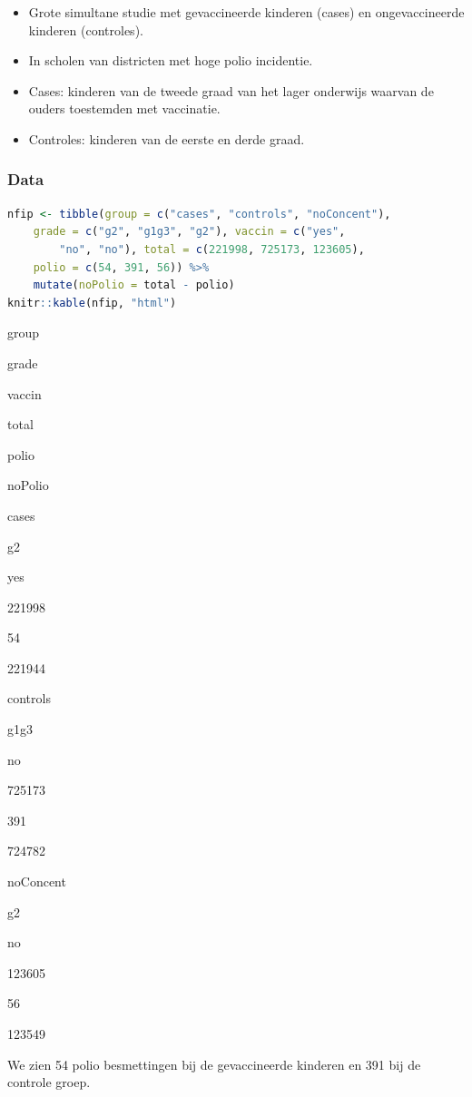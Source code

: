 \documentclass[
  12pt,dutch,coursenotes]{book}
\providecommand{\tightlist}{%
  \setlength{\itemsep}{0pt}\setlength{\parskip}{0pt}}
\begin{document}
\begin{itemize}
\tightlist
\item
  Grote simultane studie met gevaccineerde kinderen (cases) en ongevaccineerde kinderen (controles).
\item
  In scholen van districten met hoge polio incidentie.
\item
  Cases: kinderen van de tweede graad van het lager onderwijs waarvan de ouders toestemden met vaccinatie.
\item
  Controles: kinderen van de eerste en derde graad.
\end{itemize}

\hypertarget{data}{%
\subsubsection{Data}\label{data}}

\begin{lstlisting}[language=R]
nfip <- tibble(group = c("cases", "controls", "noConcent"),
    grade = c("g2", "g1g3", "g2"), vaccin = c("yes",
        "no", "no"), total = c(221998, 725173, 123605),
    polio = c(54, 391, 56)) %>%
    mutate(noPolio = total - polio)
knitr::kable(nfip, "html")
\end{lstlisting}

group

grade

vaccin

total

polio

noPolio

cases

g2

yes

221998

54

221944

controls

g1g3

no

725173

391

724782

noConcent

g2

no

123605

56

123549

We zien 54 polio besmettingen bij de gevaccineerde kinderen
en 391 bij de controle groep.
\end{document}
